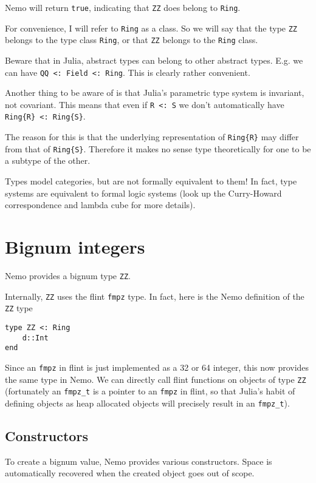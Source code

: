 \documentclass[a4paper,10pt]{article}
\newcommand{\code}{\lstinline}
\begin{document}
{Nemo will return \code{true}, indicating that \code{ZZ} does belong to \code{Ring}.

For convenience, I will refer to \code{Ring} as a class. So we will say that the 
type \code{ZZ} belongs to the type class \code{Ring}, or that \code{ZZ} belongs to
the \code{Ring} class.

Beware that in Julia, abstract types can belong to other abstract types. E.g. we
can have \code{QQ <: Field <: Ring}. This is clearly rather convenient.

Another thing to be aware of is that Julia's parametric type system is invariant,
not covariant. This means that even if \code{R <: S} we don't automatically have
\code|Ring{R} <: Ring{S}|.

The reason for this is that the underlying representation of \code|Ring{R}| may
differ from that of \code|Ring{S}|. Therefore it makes no sense type theoretically
for one to be a subtype of the other.

Types model categories, but are not formally equivalent to them! In fact, type
systems are equivalent to formal logic systems (look up the Curry-Howard
correspondence and lambda cube for more details).

\section{Bignum integers}

Nemo provides a bignum type \code{ZZ}.

Internally, \code{ZZ} uses the flint \code{fmpz} type. In fact, here is the Nemo
definition of the \code{ZZ} type

\begin{lstlisting}
type ZZ <: Ring
    d::Int
end
\end{lstlisting}

Since an \code{fmpz} in flint is just implemented as a 32 or 64 integer, this now 
provides the same type in Nemo. We can directly call flint functions on objects of
type \code{ZZ} (fortunately an \code{fmpz_t} is a pointer to an \code{fmpz} in 
flint, so that Julia's habit of defining objects as heap allocated objects will 
precisely result in an \code{fmpz_t}).

\subsection{Constructors}

To create a bignum value, Nemo provides various constructors. Space is automatically
recovered when the created object goes out of scope.

}
\end{document}
